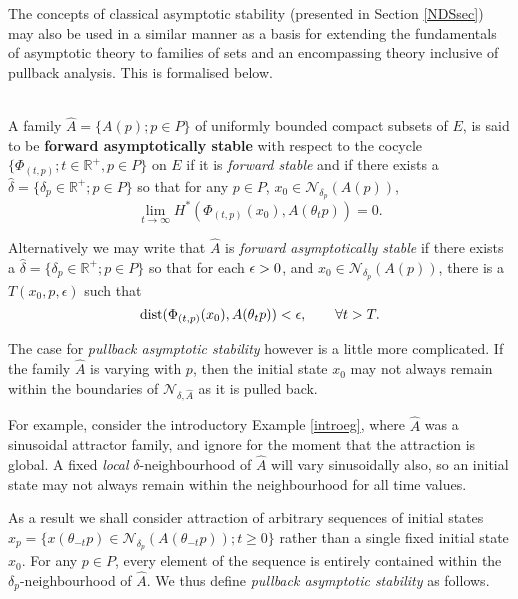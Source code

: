 The concepts of classical asymptotic stability (presented in
Section \ref{NDSsec}) may also be used in a similar manner as a
basis for extending the fundamentals of asymptotic theory to
families of sets and an encompassing theory inclusive of pullback
analysis. This is formalised below.


\begin{defn}\label{FASdef} \hfill \\
   A family $\hat{A} = \{A(p) ; p \in P\}$ of uniformly bounded compact
   subsets of $E$, is said to be
   {\bf forward asymptotically stable} with respect to the cocycle
   $\{\Phi_{(t,p)}; t \in \mathbb{R}^{+},p \in P\}$ on $E$ if it is {\em
   forward stable} and if there exists a $\hat{\delta} = \{\delta_p \in
   \mathbb{R}^+; p \in P\}$ so that for any $p \in P$, $x_0 \in
   \mathcal{N}_{\delta_p}(A(p))$,
   \begin{equation}\label{FASeq}
      \lim_{t \rightarrow \infty} H^{*}(\Phi_{(t,p)}(x_0),A(\theta_t p)) = 0.
   \end{equation}
\end{defn}

Alternatively we may write that $\hat{A}$ is {\em forward
asymptotically stable} if there exists a $\hat{\delta} =
\{\delta_p \in \mathbb{R}^+; p \in P\}$ so that for each $\epsilon > 0$,
and $x_0 \in \mathcal{N}_{\delta_p}(A(p))$, there is a $T(x_0, p,
\epsilon)$ such that
\[ {\rm dist}(\Phi_{(t,p)}(x_0),A(\theta_{t}p)) < \epsilon, \qquad \forall t > T. \]

The case for {\em pullback asymptotic stability} however is a
little more complicated. If the family $\hat{A}$ is varying with
$p$, then the initial state $x_0$ may not always remain within the
boundaries of $\mathcal{N}_{\delta, \hat{A}}$ as it is pulled
back.

For example, consider the introductory Example \ref{introeg}, where
$\hat{A}$ was a sinusoidal attractor family, and ignore for the moment that the
attraction is global. A fixed \textit{local} $\delta$-neighbourhood of $\hat{A}$
will vary sinusoidally also, so an initial state may not always remain within
the neighbourhood for all time values.

As a result we shall consider attraction of arbitrary
sequences of initial states $\hat{x}_p = \{x(\theta_{-t}p) \in
\mathcal{N}_{\delta_p} (A(\theta_{-t}p)); t \geq 0 \}$ rather than a single fixed
initial state $x_0$. For any $p \in P$, every element of the sequence is
entirely contained within the $\delta_p$-neighbourhood of $\hat{A}$. We
thus define {\em pullback asymptotic stability} as follows.

